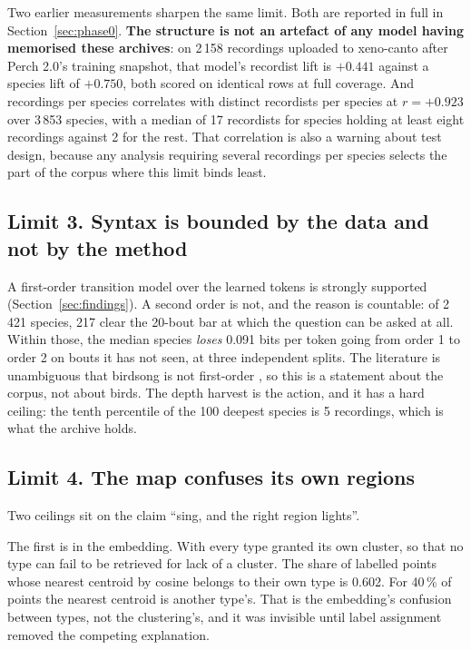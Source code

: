 \documentclass[10pt,twocolumn,a4paper]{article}
\begin{document}
Two earlier measurements sharpen the same limit. Both are reported in full in
Section~\ref{sec:phase0}. \textbf{The structure is not an artefact of any model
having memorised these archives}: on 2\,158 recordings uploaded to xeno-canto after Perch
2.0's training snapshot, that model's recordist lift is $+0.441$ against a species lift of
$+0.750$, both scored on identical rows at full coverage. And recordings per species correlates
with distinct recordists per species at $r = +0.923$ over 3\,853 species, with a median of 17
recordists for species holding at least eight recordings against 2 for the rest. That
correlation is also a warning about test design, because any analysis requiring several
recordings per species selects the part of the corpus where this limit binds least.

\subsection{Limit 3. Syntax is bounded by the data and not by the method}

A first-order transition model over the learned tokens is strongly supported
(Section~\ref{sec:findings}). A second order is not, and the reason is countable: of 2\,421
species, 217 clear the 20-bout bar at which the question can be asked at all. Within those,
the median species \emph{loses} 0.091 bits per token going from order 1 to order 2 on bouts
it has not seen, at three independent splits.
The literature is unambiguous that birdsong is not
first-order \citep{jin2011,lu2025}, so this is a statement about the corpus, not about
birds. The depth harvest is the action, and it has a hard ceiling: the tenth percentile of
the 100 deepest species is 5 recordings, which is what the archive holds.

\subsection{Limit 4. The map confuses its own regions}

Two ceilings sit on the claim ``sing, and the right region lights''.

The first is in the embedding. With every type granted its own cluster, so that no type
can fail to be retrieved for lack of a cluster. The share of labelled points whose
nearest centroid by cosine belongs to their own type is 0.602. For 40\,\% of points the
nearest centroid is another type's. That is the embedding's confusion between types, not
the clustering's, and it was invisible until label assignment removed the competing
explanation.
\end{document}
